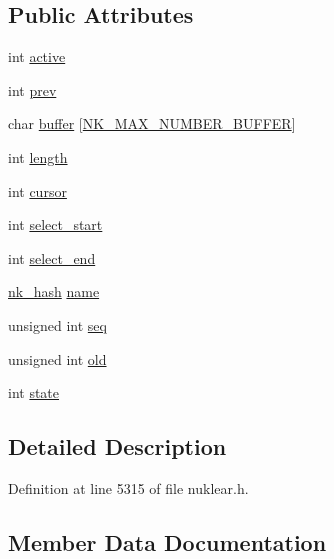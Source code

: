 \subsection*{Public Attributes}
\begin{DoxyCompactItemize}
\item 
int \mbox{\hyperlink{structnk__property__state_a70348c13baea22b6df6ad5fa1ef84f0a}{active}}
\item 
int \mbox{\hyperlink{structnk__property__state_ac200409ca5d075add6a4b68c3943e080}{prev}}
\item 
char \mbox{\hyperlink{structnk__property__state_aba9b0d6a242c09b6c949f933a3c4d6c0}{buffer}} \mbox{[}\mbox{\hyperlink{nuklear_8h_ad77efd6e24a599928777c715d0b2792b}{N\+K\+\_\+\+M\+A\+X\+\_\+\+N\+U\+M\+B\+E\+R\+\_\+\+B\+U\+F\+F\+ER}}\mbox{]}
\item 
int \mbox{\hyperlink{structnk__property__state_a7fb78c3d605eeda826192d5cb52bc65a}{length}}
\item 
int \mbox{\hyperlink{structnk__property__state_a39f7b5ce4bacdc4dc826c13081b13a16}{cursor}}
\item 
int \mbox{\hyperlink{structnk__property__state_a5a6dca290782c4691a70948aa6a2d403}{select\+\_\+start}}
\item 
int \mbox{\hyperlink{structnk__property__state_a4387cb65804a20dc3cc03b8a7bf388e5}{select\+\_\+end}}
\item 
\mbox{\hyperlink{nuklear_8h_a2123e2728db7d1f136b57d6528a0d757}{nk\+\_\+hash}} \mbox{\hyperlink{structnk__property__state_a6f05883484dcfe7d79af5dd6fda2b2ed}{name}}
\item 
unsigned int \mbox{\hyperlink{structnk__property__state_a17a7408517599a09e6244421b2f06f9b}{seq}}
\item 
unsigned int \mbox{\hyperlink{structnk__property__state_a425994ca840cd84b4bb43c14cc761f19}{old}}
\item 
int \mbox{\hyperlink{structnk__property__state_acb8b93d0b35c75577a73362e05617259}{state}}
\end{DoxyCompactItemize}


\subsection{Detailed Description}


Definition at line 5315 of file nuklear.\+h.



\subsection{Member Data Documentation}
\mbox{\label{structnk__property__state_a70348c13baea22b6df6ad5fa1ef84f0a}} 
